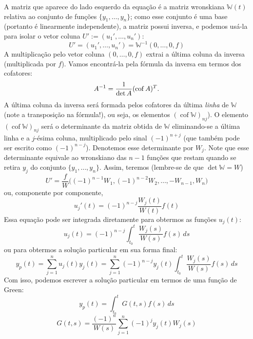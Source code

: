 \documentclass[12pt,a4paper,oneside]{memoir}
\newcommand{\WronskianMatrix}{\mathbb{W}}
\DeclareMathOperator{\cof}{cof}
\begin{document}
A matriz que aparece do lado esquerdo da equação é a matriz wronskiana $\WronskianMatrix(t)$ relativa ao conjunto de funções $\{y_1, \ldots, y_n\}$; como esse conjunto é uma base (portanto é linearmente independente), a matriz possui inversa, e podemos usá-la para isolar o vetor coluna $U' := (u_1', \ldots, u_n')$:
\[
  U'
  = (u_1', \ldots, u_n')
  = \WronskianMatrix^{-1} (0, \ldots, 0, f)
\]
A multiplicação pelo vetor coluna $(0, \ldots, 0, f)$ extrai a última coluna da inversa (multiplicada por $f$).  Vamos encontrá-la pela fórmula da inversa em termos dos cofatores: \[
  A^{-1} = \frac{1}{\det A} (\cof A)^T \text. \]
A última coluna da inversa será formada pelos cofatores da última \emph{linha} de $\WronskianMatrix$ (note a transposição na fórmula!), ou seja, os elementos $(\cof \WronskianMatrix)_{nj}$).  O elemento $(\cof \WronskianMatrix)_{nj}$ será o determinante da matriz obtida de $\WronskianMatrix$ eliminando-se a última linha e a $j$-ésima coluna, multiplicado pelo sinal $(-1)^{n+j}$ (que também pode ser escrito como $(-1)^{n-j}$).  Denotemos esse determinante por $W_j$.  Note que esse determinante equivale ao wronskiano das $n-1$ funções que restam quando se retira $y_j$ do conjunto $\{y_1, \ldots, y_n\}$.  Assim, teremos (lembre-se de que $\det \WronskianMatrix = W$)
\[
  U' = \frac{f}{W}
       \big(
         (-1)^{n-1} W_1,
         (-1)^{n-2} W_2,
         \ldots,
         -W_{n-1},
         W_n \big)
\]
ou, componente por componente,
\begin{equation}
  u_j'(t) = (-1)^{n-j} \frac{W_j(t)}{W(t)} f(t)
\end{equation}
Essa equação pode ser integrada diretamente para obtermos as funções $u_j(t)$:
\begin{equation}
  u_j(t) = (-1)^{n-j} \int_{t_0}^{t} \frac{W_j(s)}{W(s)} f(s)\,ds
\end{equation}
ou para obtermos a solução particular em sua forma final:
\begin{equation}
  y_p(t)
    = \sum_{j=1}^{n} u_j(t) y_j(t)
    = \sum_{j=1}^{n} (-1)^{n-j} y_j(t) \int_{t_0}^{t} \frac{W_j(s)}{W(s)} f(s)\,ds
\end{equation}
Com isso, podemos escrever a solução particular em termos de uma função de Green:
\begin{equation}
  y_p(t) = \int_{t_0}^{t} G(t,s) f(s)\,ds
\end{equation}
\begin{equation}
  G(t,s) = \frac{(-1)^n}{W(s)} \sum_{j=1}^{n} (-1)^{j} y_j(t) W_j(s)
\end{equation}
\end{document}
